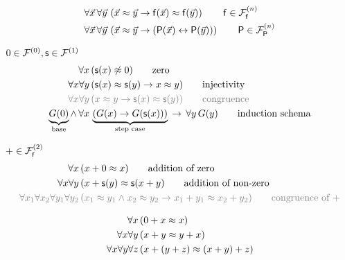 \begin{definition}
	\label{def:congruence:schemata}
	\begin{align*}
	\forall\vec{x}\,\forall\vec{y}\,
	&\left(\vec{x}\mEQ\vec{y} \limp \mf(\vec{x}) \mEQ \mf(\vec{y}) \right)
	\tag*{$\mf\in\mcFfn$}
	\\
	\forall\vec{x}\,\forall\vec{y}\, 
	&\left(\vec{x}\mEQ\vec{y} \limp (\mP(\vec{x}) \lbic \mP(\vec{y}))\right)
	\tag*{$\mP\in\mcFPn$}
	\end{align*}
\end{definition}

\begin{definition}
	\label{def:natural:numbers:axioms}
	$0\in\mcFn[0], \msucc\in\mcFn[1]$	
\begin{align*}
\forall x\, &(\msucc(x) \mNE 0)
\tag*{zero} 
\\ %
\forall x \forall y\, &(\msucc(x) \mEQ \msucc(y) \limp x \mEQ y)
\tag*{injectivity}
\\
\colG\forall x\forall y\,&\colG(x\mEQ y \limp \msucc(x)\mEQ\msucc(y))
\tag*{congruence}
\\ 
\underbrace{G(0)}_{\text{base}} 
\land\, \forall x\,&
\underbrace{
	\left(G(x) \limp G(\msucc(x))\right)
}_{\text{step case}}
\,\limp\, \forall y\,G(y)
\tag*{induction schema}
\end{align*}
\end{definition}

\begin{definition}
	[Addition]
	\label{def:addition:axioms}
	$+\in\mcFfn[2]$
\begin{align*}
\forall x\,
&(x+0 \mEQ x) 
\tag*{addition of zero}\\
\forall x\forall y\,
&(x+\msucc(y) \mEQ \msucc(x+y)
\tag*{addition of non-zero}
\\
\colG\forall x_1\forall x_2\forall y_1\forall y_2\,
&\colG (x_1\mEQ y_1\land x_2\mEQ y_2 \limp x_1+y_1\mEQ x_2+y_2)
\tag*{congruence of $+$}
\end{align*}
\end{definition}

\begin{lemma}
	\begin{align*}
	\forall x\,&(0+x \mEQ x)\\
	\forall x\forall y\,&(x+y \mEQ y+x)\\
	\forall x\forall y\forall z\,&(x+(y+z) \mEQ (x+y)+z)
	\end{align*}
\end{lemma}

